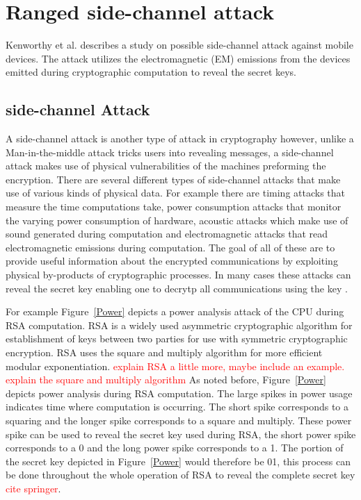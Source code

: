 \documentclass{sig-alternate}
\begin{document}
\section{Ranged side-channel attack}
\label{side}
Kenworthy et al. \cite{kenworthy} describes a study on possible side-channel attack against mobile devices. The attack utilizes the electromagnetic (EM) emissions from the devices emitted during cryptographic computation to reveal the secret keys.

\subsection{side-channel Attack}
A side-channel attack is another type of attack in cryptography however, unlike a Man-in-the-middle attack tricks users into revealing messages, a side-channel attack makes use of physical vulnerabilities of the machines preforming the encryption. There are several different types of side-channel attacks that make use of various kinds of physical data. For example there are timing attacks that measure the time computations take, power consumption attacks that monitor the varying power consumption of hardware, acoustic attacks which make use of sound generated during computation and electromagnetic attacks that read electromagnetic emissions during computation. The goal of all of these are to provide useful information about the encrypted communications by exploiting physical by-products of cryptographic processes. In many cases these attacks can reveal the secret key enabling one to decrytp all communications using the key  \cite{wiki:side-channel}.

For example Figure~\ref{Power} depicts a power analysis attack of the CPU during RSA computation. RSA is a widely used asymmetric cryptographic algorithm for establishment of keys between two parties for use with symmetric cryptographic encryption. RSA uses the square and multiply algorithm for more efficient modular exponentiation. \textcolor{red}{explain RSA a little more, maybe include an example. explain the square and multiply algorithm} As noted before, Figure~\ref{Power} depicts power analysis during RSA computation. The large spikes in power usage indicates time where computation is occurring. The short spike corresponds to a squaring and the longer spike corresponds to a square and multiply. These power spike can be used to reveal the secret key used during RSA, the short power spike corresponds to a 0 and the long power spike corresponds to a 1. The portion of the secret key depicted in Figure~\ref{Power} would therefore be 01, this process can be done throughout the whole operation of RSA to reveal the complete secret key \textcolor{red}{cite springer}.
\end{document}
